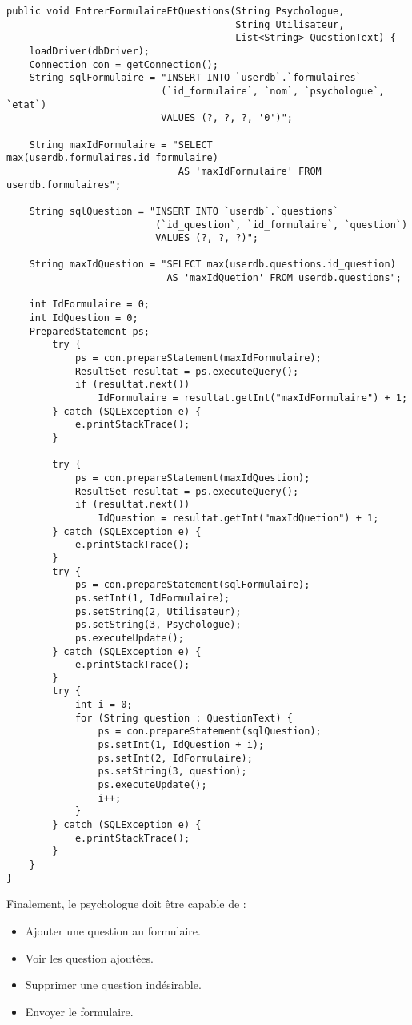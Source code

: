 \documentclass[12]{article}
\begin{document}
\begin{scriptsize}
\lstset{language=java}
\begin{lstlisting}
public void EntrerFormulaireEtQuestions(String Psychologue, 
										String Utilisateur, 
										List<String> QuestionText) {
	loadDriver(dbDriver);
	Connection con = getConnection();
	String sqlFormulaire = "INSERT INTO `userdb`.`formulaires` 
						   (`id_formulaire`, `nom`, `psychologue`, `etat`) 
						   VALUES (?, ?, ?, '0')";
						   
	String maxIdFormulaire = "SELECT max(userdb.formulaires.id_formulaire) 
							  AS 'maxIdFormulaire' FROM userdb.formulaires";
							  
	String sqlQuestion = "INSERT INTO `userdb`.`questions` 
						  (`id_question`, `id_formulaire`, `question`) 
						  VALUES (?, ?, ?)";
						  
	String maxIdQuestion = "SELECT max(userdb.questions.id_question) 
							AS 'maxIdQuetion' FROM userdb.questions";
							
	int IdFormulaire = 0;
	int IdQuestion = 0;
	PreparedStatement ps;
		try {
			ps = con.prepareStatement(maxIdFormulaire);
			ResultSet resultat = ps.executeQuery();
			if (resultat.next())
				IdFormulaire = resultat.getInt("maxIdFormulaire") + 1;
		} catch (SQLException e) {
			e.printStackTrace();
		}

		try {
			ps = con.prepareStatement(maxIdQuestion);
			ResultSet resultat = ps.executeQuery();
			if (resultat.next())
				IdQuestion = resultat.getInt("maxIdQuetion") + 1;
		} catch (SQLException e) {
			e.printStackTrace();
		}
		try {
			ps = con.prepareStatement(sqlFormulaire);
			ps.setInt(1, IdFormulaire);
			ps.setString(2, Utilisateur);
			ps.setString(3, Psychologue);
			ps.executeUpdate();
		} catch (SQLException e) {
			e.printStackTrace();
		}
		try {
			int i = 0;
			for (String question : QuestionText) {
				ps = con.prepareStatement(sqlQuestion);
				ps.setInt(1, IdQuestion + i);
				ps.setInt(2, IdFormulaire);
				ps.setString(3, question);
				ps.executeUpdate();
				i++;
			}
		} catch (SQLException e) {
			e.printStackTrace();
		}
	}
}

\end{lstlisting}
\end{scriptsize}





Finalement, le psychologue doit être capable de :\\
\begin{itemize}
\item Ajouter une question au formulaire.
\item Voir les question ajoutées.
\item Supprimer une question indésirable.
\item Envoyer le formulaire.
\end{itemize}
\end{document}
